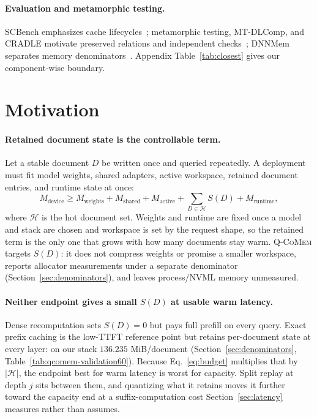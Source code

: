 \documentclass{article}
\newcommand{\qcomem}{\textsc{Q-CoMem}}
\begin{document}
\paragraph{Evaluation and metamorphic testing.}
SCBench emphasizes cache lifecycles~\citep{li2025scbench}; metamorphic testing,
MT-DLComp, and CRADLE motivate preserved relations and independent
checks~\citep{chen2018metamorphic,xiao2022metamorphic,pham2019cradle}; DNNMem
separates memory denominators~\citep{gao2020dnnmem}.  Appendix
Table~\ref{tab:closest} gives our component-wise boundary.

\section{Motivation}
\label{sec:motivation}

\paragraph{Retained document state is the controllable term.}
Let a stable document $D$ be written once and queried repeatedly. A deployment
must fit model weights, shared adapters, active workspace, retained document
entries, and runtime state at once:
\begin{equation}
 M_{\mathrm{device}} \geq M_{\mathrm{weights}}+M_{\mathrm{shared}}
 +M_{\mathrm{active}}+\sum_{D\in\mathcal{H}}S(D)+M_{\mathrm{runtime}},
 \label{eq:budget}
\end{equation}
where $\mathcal{H}$ is the hot document set. Weights and runtime are fixed once
a model and stack are chosen and workspace is set by the request shape, so the
retained term is the only one that grows with how many documents stay warm.
\qcomem{} targets $S(D)$: it does not compress weights or promise a smaller
workspace, reports allocator measurements under a separate denominator
(Section~\ref{sec:denominators}), and leaves process/NVML memory unmeasured.

\paragraph{Neither endpoint gives a small $S(D)$ at usable warm latency.}
Dense recomputation sets $S(D)=0$ but pays full prefill on every query.  Exact
prefix caching is the low-TTFT reference point but retains per-document state
at every layer: on our stack $136.235$ MiB/document
(Section~\ref{sec:denominators}, Table~\ref{tab:qcomem-validation60}).  Because
Eq.~\ref{eq:budget} multiplies that by $|\mathcal{H}|$, the endpoint best for
warm latency is worst for capacity.  Split replay at depth $j$ sits between
them, and quantizing what it retains moves it further toward the capacity end
at a suffix-computation cost Section~\ref{sec:latency} measures rather than
assumes.
\end{document}
